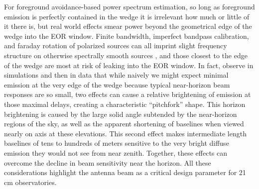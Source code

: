 
For foreground avoidance-based power spectrum estimation, so long as foreground emission is perfectly contained in the wedge it is irrelevant how much or 
little of it there is, but real world effects smear power beyond the geometrical edge of the wedge into the EOR 
window. Finite bandwidth, imperfect bandpass calibration, and faraday rotation of polarized sources can all imprint slight frequency structure on otherwise spectrally smooth sources \citep{jelic2010,bernardi13, moore13,moore15,asad15,newburgh14,shaw15}, and those closest to the edge of the wedge are 
most at risk of leaking into the EOR window. In fact, 
\citet{nithya15,nithya15b} observe in simulations and then in data that while naively we might expect minimal emission 
at the very edge of the wedge because typical near-horizon beam responses are so small, 
two effects can cause a relative brightening of emission at those maximal delays, creating a characteristic ``pitchfork'' shape. This horizon 
brightening is caused by the large solid angle subtended by the near-horizon regions of the 
sky, as well as the apparent shortening of baselines when viewed nearly on axis at these elevations. 
This second effect makes intermediate length baselines of tens to hundreds of meters sensitive to the very bright diffuse 
emission they would not see from near zenith. Together, these effects can overcome the decline in beam sensitivity near the horizon. 
All these considerations highlight the antenna beam as a critical design parameter for 
21\,cm observatories.

